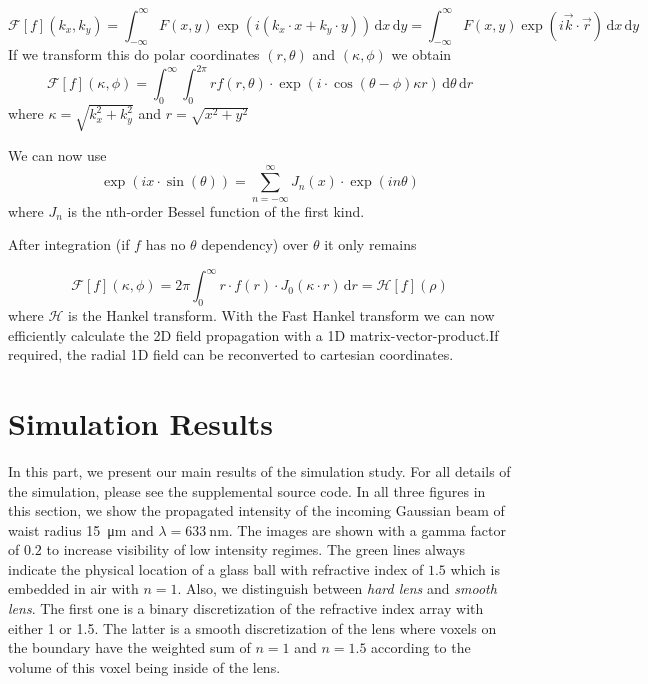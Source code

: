 \documentclass[a4paper,12pt]{article}
\begin{document}
\begin{equation}
\mathcal{F}[f](k_x, k_y) = \int_{-\infty}^{\infty} F(x,y) \exp(i (k_x \cdot x + k_y \cdot y)) \,\mathrm{d}x\, \mathrm{d}y = \int_{-\infty}^{\infty} F(x,y) \exp(i \vec k \cdot \vec r) \,\mathrm{d}x\, \mathrm{d}y
\end{equation}
If we transform this do polar coordinates $(r, \theta)$ and $(\kappa, \phi)$ we obtain
\begin{equation}
\mathcal{F}[f](\kappa, \phi) = \int_{0}^{\infty} \int_{0}^{2\pi} r f(r, \theta)\cdot \exp(i \cdot \cos(\theta - \phi) \kappa r)  \,\mathrm{d}\theta\, \mathrm{d}r
\end{equation}
where $\kappa = \sqrt{k_x^2 + k_y^2}$ and $r=\sqrt{x^2 + y^2}$

We can now use
\begin{equation}
\exp(i x \cdot \sin(\theta)) = \sum_{n=-\infty}^{\infty} J_n(x) \cdot \exp(i n \theta)
\end{equation}
where $J_n$ is the nth-order Bessel function of the first kind.

After integration (if $f$ has no $\theta$ dependency) over $\theta$ it only remains

\begin{equation}
\mathcal{F}[f](\kappa, \phi) = 2\pi \int_{0}^{\infty} r \cdot f(r) \cdot J_0(\kappa \cdot r) \, \mathrm{d}r = \mathcal{H}[f](\rho)
\end{equation}
where $\mathcal{H}$ is the Hankel transform.
With the Fast Hankel transform \cite{Guizar-Sicairos_Gutiérrez-Vega_2004} we can now efficiently calculate the 2D field propagation with a 1D matrix-vector-product.If required, the radial 1D field can be reconverted to cartesian coordinates. 

\section{Simulation Results}
\label{sec:sim}
In this part, we present our main results of the simulation study. For all details of the simulation, please see the supplemental source code.
In all three figures in this section, we show the propagated intensity of the incoming Gaussian beam of waist radius \SI{15}{\micro\meter} and $\lambda=\SI{633}{\nano\meter}$. The images are shown with a gamma factor of $0.2$ to increase visibility of low intensity regimes. The green lines always indicate the physical location of a glass ball with refractive index of $1.5$ which is embedded in air with $n=1$.
Also, we distinguish between \textit{hard lens} and \textit{smooth lens}. The first one is a binary discretization of the refractive index array with either 1 or 1.5. The latter is a smooth discretization of the lens where voxels on the boundary have the weighted sum of $n=1$ and $n=1.5$ according to the volume of this voxel being inside of the lens.
\end{document}
